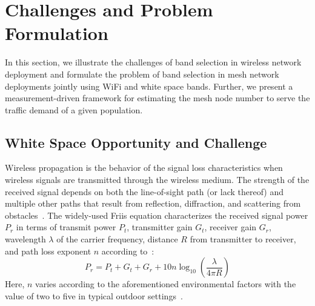 \section{Challenges and Problem Formulation}
\label{sec:problemformulation}

In this section, we illustrate the challenges of band selection
in wireless network deployment and formulate the problem of band 
selection in mesh network deployments jointly using WiFi and white space bands. 
Further, we present a measurement-driven framework for estimating the 
mesh node number to serve the traffic demand of a given population.
 
\subsection{White Space Opportunity and Challenge}
\label{subsec:motivation}
Wireless propagation is the behavior of the signal loss characteristics 
when wireless signals are transmitted through the wireless medium.
The strength of the received signal depends on both the line-of-sight
path (or lack thereof) and multiple other paths that result from 
reflection, diffraction, and scattering from 
obstacles~\cite{andersen1995propagation}. The widely-used Friis
equation characterizes the received signal power $P_r$ in terms 
of transmit power $P_t$, transmitter gain $G_t$, receiver gain $G_r$, 
wavelength $\lambda$ of the carrier frequency, 
distance $R$ from transmitter to receiver, and path loss exponent 
$n$ according to~\cite{friis}:
\begin{equation}
\label{eq:friis}
P_r=P_t+G_t+G_r+10n \log_{10}\left( \frac{\lambda}{4\pi R}\right)
\end{equation}
Here, $n$ varies according to the aforementioned environmental 
factors with the value of two to five in typical outdoor 
settings~\cite{rappaport}.

